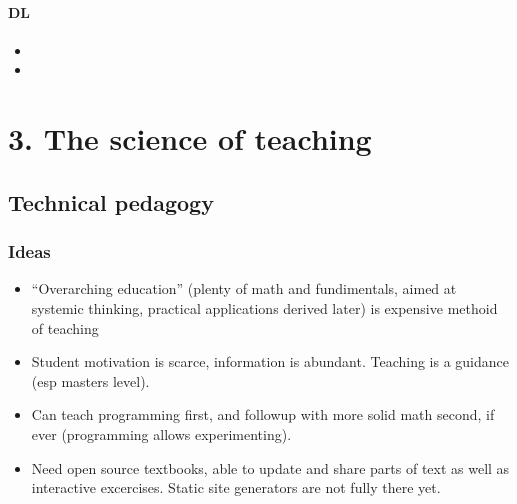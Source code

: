 \documentclass[letterpaper,10pt,english]{sphinxmanual}
\begin{document}
\subsubsection{DL}
\label{\detokenize{textbook/ml-dl:id2}}\begin{itemize}
\item {} 

\item {} 

\end{itemize}


\chapter{3. The science of teaching}
\label{\detokenize{how-to-teach/index:the-science-of-teaching}}\label{\detokenize{how-to-teach/index::doc}}

\section{Technical pedagogy}
\label{\detokenize{how-to-teach/pedagogy:technical-pedagogy}}\label{\detokenize{how-to-teach/pedagogy::doc}}

\subsection{Ideas}
\label{\detokenize{how-to-teach/pedagogy:ideas}}\begin{itemize}
\item {} 
“Overarching education” (plenty of math and fundimentals, aimed at systemic thinking,
practical applications derived later) is expensive methoid of teaching

\item {} 
Student motivation is scarce, information is abundant. Teaching is a guidance (esp masters level).

\item {} 
Can teach programming first, and followup with more solid math second, if ever (programming allows experimenting).

\item {} 
Need open source textbooks, able to update and share parts of text as well as
interactive excercises. Static site generators are not fully there yet.

\end{itemize}
\end{document}
